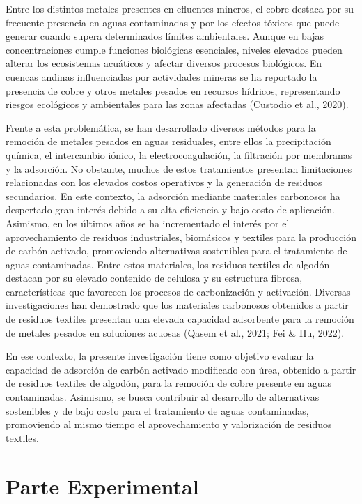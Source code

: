 \documentclass[conference,10pt]{IEEEtran}
\begin{document}
Entre los distintos metales presentes en efluentes mineros, el cobre 
destaca por su frecuente presencia en aguas contaminadas y por los efectos 
tóxicos que puede generar cuando supera determinados límites ambientales. 
Aunque en bajas concentraciones cumple funciones biológicas esenciales, 
niveles elevados pueden alterar los ecosistemas acuáticos y afectar 
diversos procesos biológicos. En cuencas andinas influenciadas por 
actividades mineras se ha reportado la presencia de cobre y otros metales 
pesados en recursos hídricos, representando riesgos ecológicos y 
ambientales para las zonas afectadas (Custodio et al., 2020).

Frente a esta problemática, se han desarrollado diversos métodos para la 
remoción de metales pesados en aguas residuales, entre ellos la 
precipitación química, el intercambio iónico, la electrocoagulación, la 
filtración por membranas y la adsorción. No obstante, muchos de estos 
tratamientos presentan limitaciones relacionadas con los elevados costos 
operativos y la generación de residuos secundarios. En este contexto, 
la adsorción mediante materiales carbonosos ha despertado gran interés 
debido a su alta eficiencia y bajo costo de aplicación. Asimismo, en los 
últimos años se ha incrementado el interés por el aprovechamiento de 
residuos industriales, biomásicos y textiles para la producción de carbón 
activado, promoviendo alternativas sostenibles para el tratamiento de 
aguas contaminadas. Entre estos materiales, los residuos textiles de 
algodón destacan por su elevado contenido de celulosa y su estructura 
fibrosa, características que favorecen los procesos de carbonización y 
activación. Diversas investigaciones han demostrado que los materiales 
carbonosos obtenidos a partir de residuos textiles presentan una elevada 
capacidad adsorbente para la remoción de metales pesados en soluciones 
acuosas (Qasem et al., 2021; Fei $\&$ Hu, 2022).

En ese contexto, la presente investigación tiene como objetivo evaluar 
la capacidad de adsorción de carbón activado modificado con úrea, obtenido 
a partir de residuos textiles de algodón, para la remoción de cobre 
presente en aguas contaminadas. Asimismo, se busca contribuir al 
desarrollo de alternativas sostenibles y de bajo costo para el tratamiento 
de aguas contaminadas, promoviendo al mismo tiempo el aprovechamiento y 
valorización de residuos textiles. 


\section{Parte Experimental}
\label{sec:exp}
\end{document}
